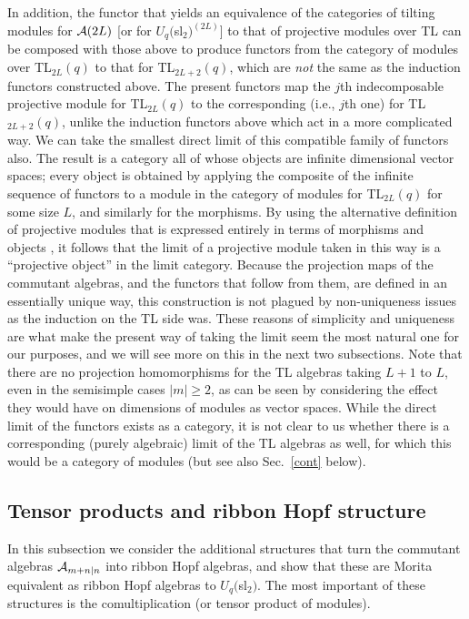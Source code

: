 \documentclass[twocolumn,floats,pra]{revtex4}
\def \cA {{\cal A}}
\begin{document}
In addition, the functor that yields an equivalence of the
categories of tilting modules for $\cA(2L)$ [or for
$U_q($sl$_2)^{(2L)}$] to that of projective modules over TL can be
composed with those above to produce functors from the category of
modules over TL$_{2L}(q)$ to that for TL$_{2L+2}(q)$, which are
{\em not} the same as the induction functors constructed above.
The present functors map the $j$th indecomposable projective
module for TL$_{2L}(q)$ to the corresponding (i.e., $j$th one) for
TL$_{2L+2}(q)$, unlike the induction functors above which act in a
more complicated way. We can take the smallest direct limit of
this compatible family of functors also. The result is a category
all of whose objects are infinite dimensional vector spaces; every
object is obtained by applying the composite of the infinite
sequence of functors to a module in the category of modules for
TL$_{2L}(q)$ for some size $L$, and similarly for the morphisms.
By using the alternative definition of projective modules that is
expressed entirely in terms of morphisms and objects \cite{anf},
it follows that the limit of a projective module taken in this way
is a ``projective object'' in the limit category. Because the
projection maps of the commutant algebras, and the functors that
follow from them, are defined in an essentially unique way, this
construction is not plagued by non-uniqueness issues as the
induction on the TL side was. These reasons of simplicity and
uniqueness are what make the present way of taking the limit seem
the most natural one for our purposes, and we will see more on
this in the next two subsections. Note that there are no
projection homomorphisms for the TL algebras taking $L+1$ to $L$,
even in the semisimple cases $|m|\geq2$, as can be seen by
considering the effect they would have on dimensions of modules as
vector spaces. While the direct limit of the functors exists as a
category, it is not clear to us whether there is a corresponding
(purely algebraic) limit of the TL algebras as well, for which
this would be a category of modules (but see also Sec.\ \ref{cont}
below).

\subsection{Tensor products and ribbon Hopf structure}

In this subsection we consider the additional structures that turn
the commutant algebras $\cA_{m+n|n}$ into ribbon Hopf algebras,
and show that these are Morita equivalent as ribbon Hopf algebras
to $U_q($sl$_2)$. The most important of these structures is the
comultiplication (or tensor product of modules).
\end{document}
